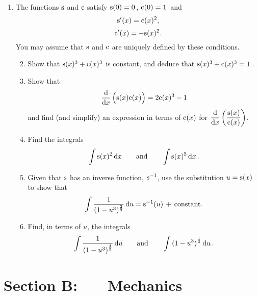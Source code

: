 \documentclass[a4, 11pt]{report}
\newlength{\qspace}
\newcounter{qnumber}
\newenvironment{question}%
 {\vspace{\qspace}
  \begin{enumerate}[\bfseries 1\quad][10]%
    \setcounter{enumi}{\value{qnumber}}%
    \item%
 }
{
  \end{enumerate}
  \filbreak
  \stepcounter{qnumber}
 }
\newenvironment{questionparts}[1][1]%
 {
  \begin{enumerate}[\bfseries (i)]%
    \setcounter{enumii}{#1}
    \addtocounter{enumii}{-1}
    \setlength{\itemsep}{5mm}
    \setlength{\parskip}{8pt}
 }
 {
  \end{enumerate}
 }
\def\c{{\rm c}}
\def\d{{\rm d}}
\def\s{{\rm s}}
\begin{document}
                                                              
\begin{question}
The functions $\s$ and $\c$ satisfy $\s(0)= 0\,$, $\c(0)=1\,$ and
\[
\s'(x) = \c(x)^2
,\]
\[
\c'(x)=-\s(x)^2.
\]
You may assume that $\s$ and $\c$  are uniquely defined  by these conditions.

\begin{questionparts}
\item Show that $\s(x)^3+\c(x)^3$ is constant, and deduce
that
 $\s(x)^3+\c(x)^3=1\,$.

\item
Show that 
\[
\frac{\d   }{\d x} \, \Big( \s(x) \c(x) \Big) = 2\c(x)^3-1
\]
and find (and simplify) an expression in terms of $\c(x)$ for 
$\dfrac{\d  }{\d x} \left( \dfrac{\s(x)}{\c(x)} \right)
$.

\item Find the integrals
\[
\int \s(x)^2 \, \d x 
\ \ \ \ \ \
\text{and}
\ \ \ \ \ \
\int \s(x)^5 \, \d x
\,.
\]
 
\item 
Given that $\s$ has an inverse function, $\s^{-1}$,
use the substitution $u = \s(x)$ to show that
\[
\int \frac{1}{(1-u^3)^{\frac{2}{3}}} \, \d u = \s^{-1}(u) 
\, + 
\text{\,constant}.
\]

\item Find, in terms of $u$, the integrals
\[
\int \frac{1}{{(1-u^3)}^{\frac{4}{3}}} \, \d u 
\ \ \ \ \ \
\text{and}
\ \ \ \ \ \
\int {(1-u^3)}^{\frac{1}{3}} \, \d u \,.
\]

\end{questionparts}

\end{question}




\newpage
\section*{Section B: \ \ \ Mechanics}
\end{document}
